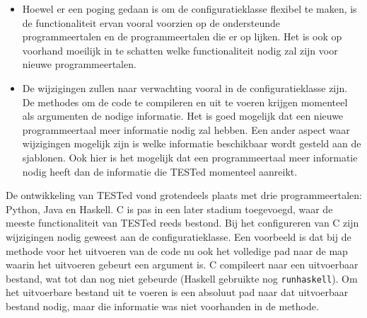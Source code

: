 \begin{itemize}
    \item Hoewel er een poging gedaan is om de configuratieklasse flexibel te maken, is de functionaliteit ervan vooral voorzien op de ondersteunde programmeertalen en de programmeertalen die er op lijken.
    Het is ook op voorhand moeilijk in te schatten welke functionaliteit nodig zal zijn voor nieuwe programmeertalen.
    \item De wijzigingen zullen naar verwachting vooral in de configuratieklasse zijn.
    De methodes om de code te compileren en uit te voeren krijgen momenteel als argumenten de nodige informatie.
    Het is goed mogelijk dat een nieuwe programmeertaal meer informatie nodig zal hebben.
    Een ander aspect waar wijzigingen mogelijk zijn is welke informatie beschikbaar wordt gesteld aan de sjablonen.
    Ook hier is het mogelijk dat een programmeertaal meer informatie nodig heeft dan de informatie die TESTed momenteel aanreikt.
\end{itemize}

De ontwikkeling van TESTed vond grotendeels plaats met drie programmeertalen: Python, Java en Haskell.
C is pas in een later stadium toegevoegd, waar de meeste functionaliteit van TESTed reeds bestond.
Bij het configureren van C zijn wijzigingen nodig geweest aan de configuratieklasse.
Een voorbeeld is dat bij de methode voor het uitvoeren van de code nu ook het volledige pad naar de map waarin het uitvoeren gebeurt een argument is.
C compileert naar een uitvoerbaar bestand, wat tot dan nog niet gebeurde (Haskell gebruikte nog \texttt{runhaskell}).
Om het uitvoerbare bestand uit te voeren is een absoluut pad naar dat uitvoerbaar bestand nodig, maar die informatie was niet voorhanden in de methode.
